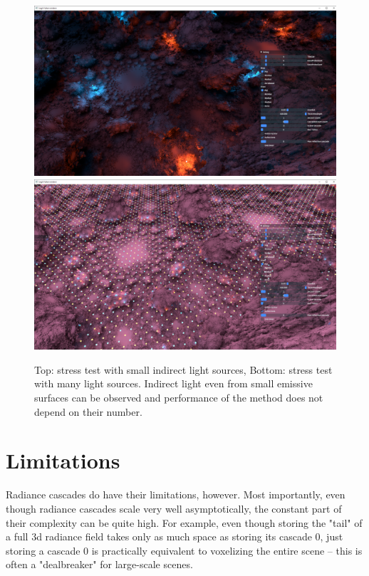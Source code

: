 \documentclass{jcgt}
\begin{document}
\begin{figure}[htb]
  \centering
  \includegraphics[width=\columnwidth]{images/sdf_stress_tiny.png}
  \includegraphics[width=\columnwidth]{images/sdf_stress_many.png}
  \caption{\label{fig:sdf_stress_test}
     Top: stress test with small indirect light sources, Bottom: stress test with many light sources. Indirect light even from small emissive surfaces can be observed and performance of the method does not depend on their number.}
\end{figure}
\clearpage
\section{Limitations}
Radiance cascades do have their limitations, however. Most importantly, even though radiance cascades scale very well asymptotically, the constant part of their complexity can be quite high. For example, even though storing the "tail" of a full 3d radiance field takes only as much space as storing its cascade 0, just storing a cascade 0 is practically equivalent to voxelizing the entire scene -- this is often a "dealbreaker" for large-scale scenes.
\end{document}
